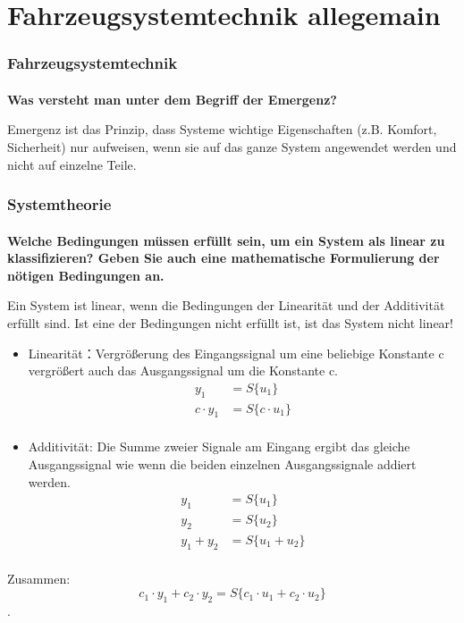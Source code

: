 \part{Fahrzeugsystemtechnik allegemain}
\section{Fahrzeugsystemtechnik}
\subsection{}\textbf{Was versteht man unter dem Begriff der Emergenz?}

Emergenz ist das Prinzip, dass Systeme wichtige Eigenschaften (z.B. Komfort, Sicherheit) nur aufweisen, wenn sie auf das ganze System angewendet werden und nicht auf einzelne Teile.

\section{Systemtheorie}
\subsection{}
\textbf{Welche Bedingungen müssen erfüllt sein, um ein System als linear zu klassifizieren? Geben Sie auch eine mathematische Formulierung der nötigen Bedingungen an.}

Ein System ist linear, wenn die Bedingungen der Linearität und der Additivität erfüllt sind. Ist eine der Bedingungen nicht erfüllt ist, ist das System nicht linear!
\begin{itemize}
    \item Linearit\"at：Vergrößerung des Eingangssignal um eine beliebige Konstante c vergrößert auch das Ausgangssignal um die Konstante c.
          \begin{equation}
              \begin{aligned}
                  y_1        & =S\{u_1\}        \\
                  c\cdot y_1 & =S\{c\cdot u_1\} \\
              \end{aligned}
          \end{equation}
    \item Additivit\"at: Die Summe zweier Signale am Eingang ergibt das gleiche Ausgangssignal wie wenn die beiden einzelnen Ausgangssignale addiert werden.
          \begin{equation}
              \begin{aligned}
                  y_1     & =S\{u_1\}          \\
                  y_2     & =S\{u_2\}          \\
                  y_1+y_2 & =S\{u_1+u_2\} \\
              \end{aligned}
          \end{equation}
\end{itemize}
Zusammen:
\begin{equation}
    c_1\cdot y_1+c_2\cdot y_2=S\{c_1\cdot u_1+c_2\cdot u_2\}
\end{equation}.


